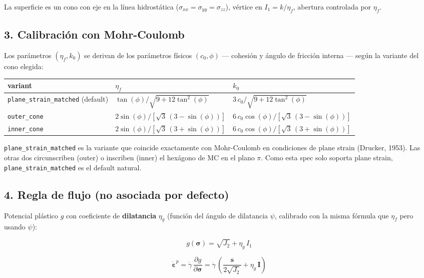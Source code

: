 \documentclass[11pt,letterpaper,oneside]{report}
\begin{document}
La superficie es un cono con eje en la línea hidrostática ($\sigma_{xx} = \sigma_{yy} = \sigma_{zz}$), vértice en $I_1 = k/\eta_f$, abertura controlada por $\eta_f$.

\subsection{3. Calibración con Mohr-Coulomb}

Los parámetros $(\eta_f, k_0)$ se derivan de los parámetros físicos $(c_0, \phi)$ --- cohesión y ángulo de fricción interna --- según la variante del cono elegida:

\begin{center}
\begin{tabularx}{\textwidth}{YYY}
\hline
\textbf{variant} & \textbf{$\eta_f$} & \textbf{$k_0$} \\
\hline
\texttt{plane\_strain\_matched} (default) & $\tan(\phi)/\sqrt{9 + 12\tan^2(\phi)}$ & $3\,c_0/\sqrt{9 + 12\tan^2(\phi)}$ \\
\texttt{outer\_cone} & $2\sin(\phi)/[\sqrt 3\,(3 - \sin(\phi))]$ & $6\,c_0\cos(\phi)/[\sqrt 3\,(3 - \sin(\phi))]$ \\
\texttt{inner\_cone} & $2\sin(\phi)/[\sqrt 3\,(3 + \sin(\phi))]$ & $6\,c_0\cos(\phi)/[\sqrt 3\,(3 + \sin(\phi))]$ \\
\hline
\end{tabularx}
\end{center}
\texttt{plane\_strain\_matched} es la variante que coincide exactamente con Mohr-Coulomb en condiciones de plane strain (Drucker, 1953). Las otras dos circunscriben (outer) o inscriben (inner) el hexágono de MC en el plano \ensuremath{\pi}. Como esta spec solo soporta plane strain, \texttt{plane\_strain\_matched} es el default natural.

\subsection{4. Regla de flujo (no asociada por defecto)}

Potencial plástico $g$ con coeficiente de \textbf{dilatancia} $\eta_g$ (función del ángulo de dilatancia $\psi$, calibrado con la misma fórmula que $\eta_f$ pero usando $\psi$):

\[
g(\boldsymbol\sigma) = \sqrt{J_2} + \eta_g\,I_1
\]

\[
\dot{\boldsymbol\varepsilon}^p = \dot\gamma\,\frac{\partial g}{\partial \boldsymbol\sigma} = \dot\gamma\,\left(\frac{\mathbf s}{2\sqrt{J_2}} + \eta_g\,\mathbf I\right)
\]
\end{document}
